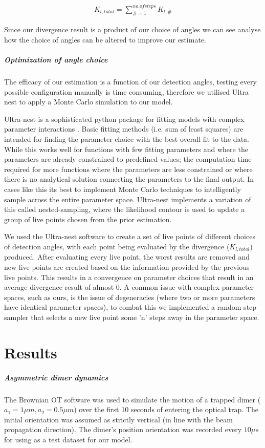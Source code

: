\documentclass[11pt]{article}
\begin{document}
	\begin{align}
		K_{l,total} = \sum\limits_{\# =1}^{no. of steps} K_{l,\#}
	\end{align}

	Since our divergence result is a product of our choice of angles we can see analyse how the choice of angles can be altered to improve our estimate.   

	\subparagraph*{Optimization of angle choice}
	The efficacy of our estimation is a function of our detection angles, testing every possible configuration manually is time consuming, therefore we utilised Ultra nest to apply a Monte Carlo simulation to our model. 
	
	Ultra-nest is a sophisticated python package for fitting models with complex parameter interactions \cite{Ultranest}. Basic fitting methods (i.e. sum of least squares) are intended for finding the parameter choice with the best overall fit to the data. While this works well for functions with few fitting parameters and where the parameters are already constrained to predefined values; the computation time required for more functions where the parameters are less constrained or where there is no analytical solution connecting the parameters to the final output. In cases like this its best to implement Monte Carlo techniques to intelligently sample across the entire parameter space. Ultra-nest implements a variation of this called nested-sampling, where the likelihood contour is used to update a group of live points chosen from the prior estimation.
	
	We used the Ultra-nest software to create a set of live points of different choices of detection angles, with each point being evaluated by the divergence ($K_{l, total}$) produced. After evaluating every live point, the worst results are removed and new live points are created based on the information provided by the previous live points. This results in a convergence on parameter choices that result in an average divergence result of almost 0. A common issue with complex parameter spaces, such as ours, is the issue of degeneracies (where two or more parameters have identical parameter spaces), to combat this we implemented a random step sampler that selects a new live point some 'n' steps away in the parameter space.
	
	\section*{Results}
	\subparagraph*{Asymmetric dimer dynamics}
	The Brownian OT software was used to simulate the motion of a trapped dimer ($a_1=1\mu m, a_2=0.5\mu m$) over the first 10 seconds of entering the optical trap. The initial orientation was assumed as strictly vertical (in line with the beam propagation direction). The dimer's position orientation was recorded every $10 \mu s$ for using as a test dataset for our model. 
	
\end{document}
